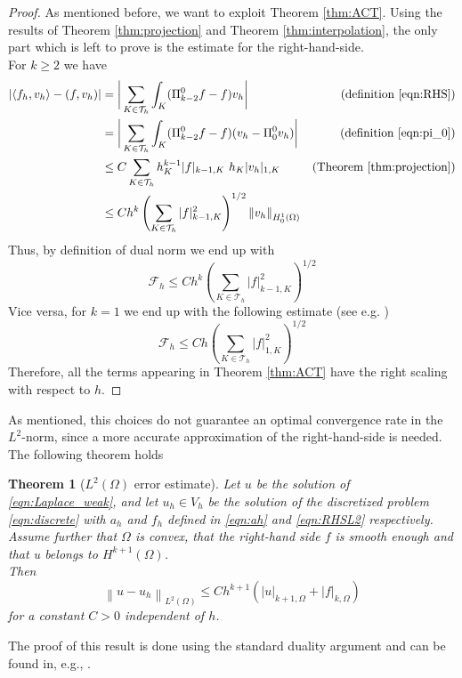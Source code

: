 \documentclass[10pt]{article}
\newcommand{\norm}[2]{\left\lVert#1\right\rVert_{#2}}
\newtheorem{theorem}{Theorem}
\begin{document}
\begin{proof}
	As mentioned before, we want to exploit Theorem \ref{thm:ACT}. Using the results of Theorem \ref{thm:projection} and Theorem \ref{thm:interpolation}, the only part which is left to prove is the estimate for the right-hand-side. \\
	For $k\geq 2$ we have
	\begin{align*}
	|\langle f_h,v_h \rangle - (f,v_h)|&=\bigg\lvert \sum_{K \in \mathcal{T}_h} \int_K (\Pi_{k-2}^0 f - f) v_h \bigg\rvert   & \text{(definition \eqref{eqn:RHS})} \\
	&=\bigg\lvert \sum_{K \in \mathcal{T}_h} \int_K (\Pi_{k-2}^0 f - f) (v_h-\Pi_0^0 v_h) \bigg\rvert & \text{(definition \eqref{eqn:pi_0})} \\
	&\leq C \sum_{K \in \mathcal{T}_h} h_K^{k-1}|f|_{k-1,K} \ h_K |v_h|_{1,K}  & \text{(Theorem \ref{thm:projection})}  \\
	&\leq C h^k \left( \sum_{K \in \mathcal{T}_h} |f|^2_{k-1,K} \right)^{1/2} \norm{v_h}{H_0^1(\Omega)}
	\end{align*}
	Thus, by definition of dual norm we end up with
	$$\mathcal{F}_h \leq C h^k \left( \sum_{K \in \mathcal{T}_h} |f|^2_{k-1,K} \right)^{1/2}$$
	Vice versa, for $k=1$ we end up with the following estimate (see e.g. \cite{Basic_principles})
	$$\mathcal{F}_h \leq C h \left( \sum_{K \in \mathcal{T}_h} |f|^2_{1,K} \right)^{1/2}$$
	Therefore, all the terms appearing in Theorem \ref{thm:ACT} have the right scaling with respect to $h$.
\end{proof}
As mentioned, this choices do not guarantee an optimal convergence rate in the $L^2$-norm, since a more accurate approximation of the right-hand-side is needed. The following theorem holds \\
\begin{theorem} [$L^2(\Omega)$ error estimate]
	Let $u$ be the solution of \eqref{eqn:Laplace_weak}, and let $u_h \in V_h$ be the solution of the discretized problem \eqref{eqn:discrete} with $a_h$ and $f_h$ defined in \eqref{eqn:ah} and \eqref{eqn:RHSL2} respectively. \\
	Assume further that $\Omega$ is convex, that the right-hand side $f$ is smooth enough and that u belongs to $H^{k+1}(\Omega)$. \\
	Then
	$$\norm{u-u_h}{L^2(\Omega)} \leq C h^{k+1} (|u|_{k+1,\Omega}+|f|_{k,\Omega})$$ for a constant $C>0$ independent of $h$.
\end{theorem}
The proof of this result is done using the standard duality argument and can be found in, e.g., \cite{Equivalent_proj}.
\end{document}

